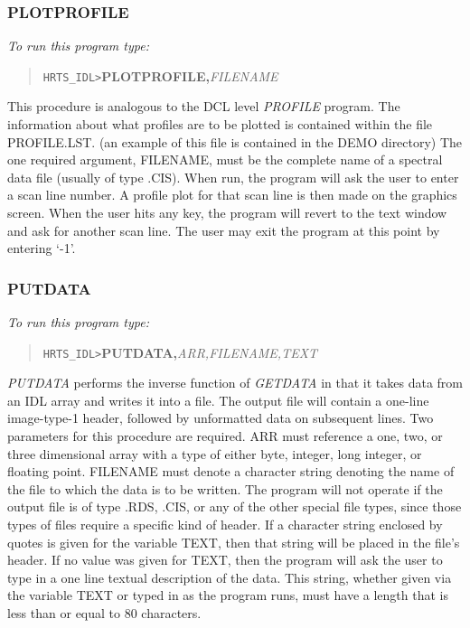 \subsubsection{PLOTPROFILE}

{\em To run this program type:}
\begin{quote}
{\tt HRTS\_IDL>}{\bf PLOTPROFILE,}{\it FILENAME}             
\end{quote}
   This procedure is analogous to the DCL level {\em PROFILE} program.  The
   information about what profiles are to be plotted is contained within
   the file PROFILE.LST. (an example of this file is contained in 
   the DEMO directory)
   The one required argument, FILENAME, must be the complete name of a
   spectral data file (usually of type .CIS).  When run, the program will
   ask the user to enter a scan line number.  A profile plot for that scan
   line is then made on the graphics screen.  When the user hits any key,
   the program will revert to the text window and ask for another scan
   line.  The user may exit the program at this point by entering `-1'.

\subsubsection{PUTDATA}             

{\em To run this program type:}
\begin{quote}
{\tt HRTS\_IDL>}{\bf PUTDATA,}{\it ARR,FILENAME,TEXT}
\end{quote}
{\em PUTDATA} performs the inverse function of {\em GETDATA} in that it takes
   data from an IDL array and writes it into a file. The output file will 
   contain a one-line image-type-1 header, followed by unformatted data on
   subsequent lines.  Two parameters for this procedure are required.  ARR
   must reference a one, two, or three dimensional array with a type of
   either byte, integer, long integer, or floating point.  FILENAME must
   denote a character string denoting the name of the file to which the
   data is to be written.  The program will not operate if the output file
   is of type .RDS, .CIS, or any of the other special file types, since
   those types of files require a specific kind of header.  If a character
   string enclosed by quotes is given for the variable TEXT, then that
   string will be placed in the file's header.  If no value was given for
   TEXT, then the program will ask the user to type in a one line textual
   description of the data.  This string, whether given via the variable
   TEXT or typed in as the program runs, must have a length that is less
   than or equal to 80 characters.

